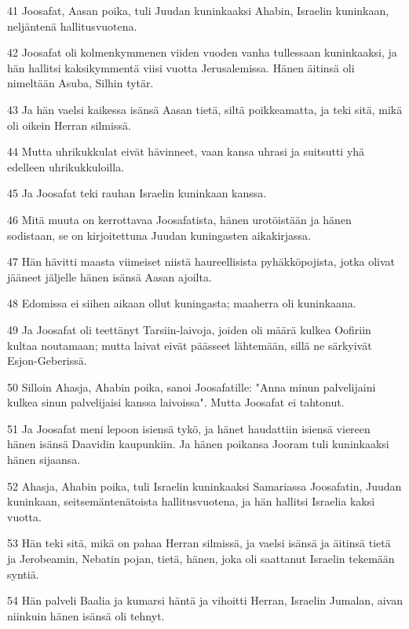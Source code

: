 \par 41 Joosafat, Aasan poika, tuli Juudan kuninkaaksi Ahabin, Israelin kuninkaan, neljäntenä hallitusvuotena.
\par 42 Joosafat oli kolmenkymmenen viiden vuoden vanha tullessaan kuninkaaksi, ja hän hallitsi kaksikymmentä viisi vuotta Jerusalemissa. Hänen äitinsä oli nimeltään Asuba, Silhin tytär.
\par 43 Ja hän vaelsi kaikessa isänsä Aasan tietä, siltä poikkeamatta, ja teki sitä, mikä oli oikein Herran silmissä.
\par 44 Mutta uhrikukkulat eivät hävinneet, vaan kansa uhrasi ja suitsutti yhä edelleen uhrikukkuloilla.
\par 45 Ja Joosafat teki rauhan Israelin kuninkaan kanssa.
\par 46 Mitä muuta on kerrottavaa Joosafatista, hänen urotöistään ja hänen sodistaan, se on kirjoitettuna Juudan kuningasten aikakirjassa.
\par 47 Hän hävitti maasta viimeiset niistä haureellisista pyhäkköpojista, jotka olivat jääneet jäljelle hänen isänsä Aasan ajoilta.
\par 48 Edomissa ei siihen aikaan ollut kuningasta; maaherra oli kuninkaana.
\par 49 Ja Joosafat oli teettänyt Tarsiin-laivoja, joiden oli määrä kulkea Oofiriin kultaa noutamaan; mutta laivat eivät päässeet lähtemään, sillä ne särkyivät Esjon-Geberissä.
\par 50 Silloin Ahasja, Ahabin poika, sanoi Joosafatille: "Anna minun palvelijaini kulkea sinun palvelijaisi kanssa laivoissa". Mutta Joosafat ei tahtonut.
\par 51 Ja Joosafat meni lepoon isiensä tykö, ja hänet haudattiin isiensä viereen hänen isänsä Daavidin kaupunkiin. Ja hänen poikansa Jooram tuli kuninkaaksi hänen sijaansa.
\par 52 Ahasja, Ahabin poika, tuli Israelin kuninkaaksi Samariassa Joosafatin, Juudan kuninkaan, seitsemäntenätoista hallitusvuotena, ja hän hallitsi Israelia kaksi vuotta.
\par 53 Hän teki sitä, mikä on pahaa Herran silmissä, ja vaelsi isänsä ja äitinsä tietä ja Jerobeamin, Nebatin pojan, tietä, hänen, joka oli saattanut Israelin tekemään syntiä.
\par 54 Hän palveli Baalia ja kumarsi häntä ja vihoitti Herran, Israelin Jumalan, aivan niinkuin hänen isänsä oli tehnyt.


